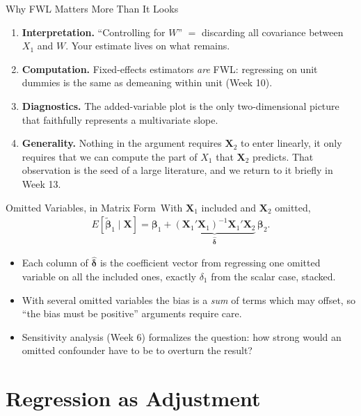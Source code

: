 \documentclass[aspectratio=169,11pt,xcolor=dvipsnames]{beamer}
\newcommand{\E}{E}
\newcommand{\X}{\bm{X}}
\newcommand{\adv}{\,\raisebox{0.6pt}{\textcolor{accent}{$\bigstar$}}}
\begin{document}
\begin{frame}{Why FWL Matters More Than It Looks}
\begin{enumerate}\itemsep6pt
  \item \textbf{Interpretation.} ``Controlling for $W$'' $=$ discarding all
        covariance between $X_1$ and $W$. Your estimate lives on what remains.
  \item \textbf{Computation.} Fixed-effects estimators \emph{are} FWL: regressing
        on unit dummies is the same as demeaning within unit (Week 10).
  \item \textbf{Diagnostics.} The added-variable plot is the only two-dimensional
        picture that faithfully represents a multivariate slope.
  \item \textbf{Generality.} Nothing in the argument requires $\X_2$ to enter
        linearly, it only requires that we can compute the part of $X_1$ that
        $\X_2$ predicts. That observation is the seed of a large literature, and
        we return to it briefly in Week 13.
\end{enumerate}
\end{frame}

\begin{frame}{Omitted Variables, in Matrix Form\adv}
With $\X_1$ included and $\X_2$ omitted,
\begin{align*}
  \E[\tilde{\bm\beta}_1 \mid \X]
  = \bm\beta_1 + \underbrace{(\X_1'\X_1)^{-1}\X_1'\X_2}_{\hat{\bm\delta}}\,\bm\beta_2 .
\end{align*}
\begin{itemize}\itemsep4pt
  \item Each column of $\hat{\bm\delta}$ is the coefficient vector from regressing
        one omitted variable on all the included ones, exactly $\delta_1$ from
        the scalar case, stacked.
  \item With several omitted variables the bias is a \emph{sum} of terms which may
        offset, so ``the bias must be positive'' arguments require care.
  \item Sensitivity analysis (Week 6) formalizes the question: how strong would an
        omitted confounder have to be to overturn the result?
\end{itemize}
\end{frame}

\section[Adjustment]{Regression as Adjustment}
\begin{frame}\sectionpage\end{frame}
\end{document}
